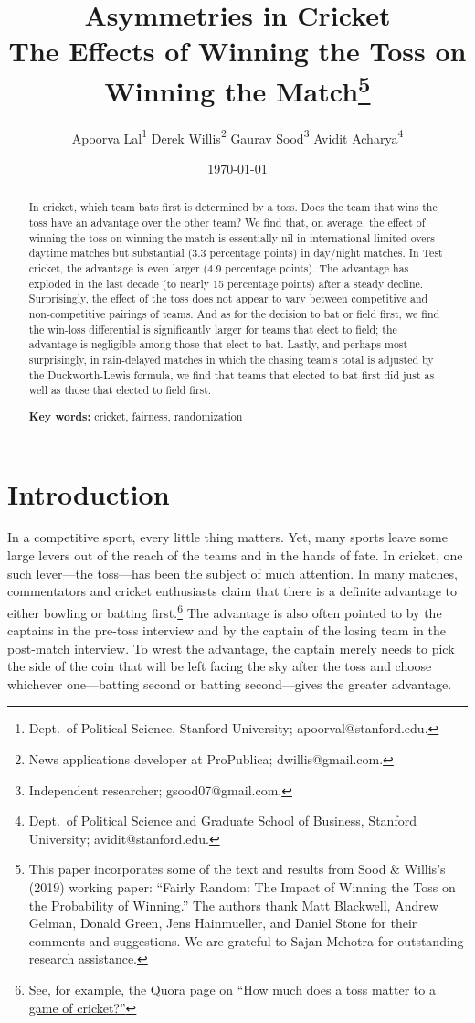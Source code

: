 \documentclass[11pt,  letterpaper]{article}
\title{\textbf{Asymmetries in Cricket \\ \vspace{5pt} \large{The Effects of Winning the Toss on Winning the Match}}\thanks{This paper incorporates some of the text and 
results from Sood \& Willis's (2019) working paper: ``Fairly Random: The Impact of Winning the Toss on the Probability of Winning.'' The authors thank Matt Blackwell, 
Andrew Gelman, Donald Green, Jens Hainmueller, and Daniel Stone for their comments and suggestions. We are grateful to Sajan Mehotra for outstanding research assistance. 
}}
\author{
Apoorva Lal\thanks{Dept.~of Political Science, Stanford University;  \textsf{apoorval@stanford.edu}.} \;\;
Derek Willis\thanks{News applications developer at ProPublica;  \textsf{dwillis@gmail.com}.}  \;\;
Gaurav Sood\thanks{Independent researcher;  \textsf{gsood07@gmail.com}.} \;\;
Avidit Acharya\thanks{Dept.~of Political Science and Graduate School of Business, Stanford University; \textsf{avidit@stanford.edu}.}
}
\date{\today}
\begin{document}
\maketitle

\begin{abstract}

In cricket, which team bats first is determined by a toss. Does the team that wins the toss have an advantage over the other team? We find that, on average, the effect of winning the toss on winning the match is essentially nil in international limited-overs daytime matches but substantial (3.3 percentage points) in day/night matches. In Test cricket, the advantage is even larger (4.9 percentage points). The advantage has exploded in the last decade (to nearly 15 percentage points) after a steady decline. Surprisingly, the effect of the toss does not appear to vary between competitive and non-competitive pairings of teams. And as for the decision to bat or field first, we find the win-loss differential is significantly larger for teams that elect to field; the advantage is negligible among those that elect to bat. Lastly, and perhaps most surprisingly, in rain-delayed matches in which the chasing team's total is adjusted by the Duckworth-Lewis formula, we find that teams that elected to bat first did just as well as those that elected to field first.


\smallskip

\textbf{Key words:} cricket, fairness, randomization

\end{abstract}




%
\section{Introduction}
In a competitive sport, every little thing matters. Yet, many sports leave some large levers out of the reach of the teams and in the
hands of fate. In cricket, one such lever---the toss---has been the subject of much attention. In many matches, commentators and cricket enthusiasts claim that there is a definite advantage to either bowling or batting first.\footnote{See, for example, the \href{https://www.quora.com/How-much-does-a-toss-matter-to-a-game-of-cricket}{Quora page on ``How much does a toss matter to a game of cricket?''}} The advantage is also often pointed to by the captains in the pre-toss interview and by the captain of the losing team in the post-match interview. To wrest the advantage, the captain merely needs to pick the side of the coin that will be left facing the sky after the toss and choose whichever one---batting second or batting second---gives the greater advantage.
\end{document}
